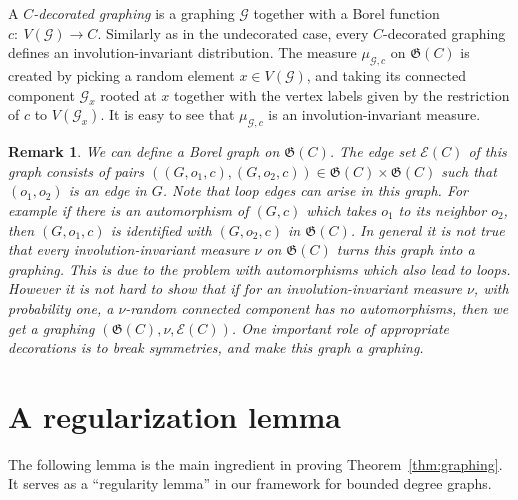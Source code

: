 \documentclass{article}
\newtheorem{remark}[theorem]{Remark}
\def\GG{\mathcal{G}}\def\HH{\mathcal{H}}\def\II{\mathcal{I}}
\def\Gf{\mathfrak{G}}\def\Hf{\mathfrak{H}}\def\If{\mathfrak{I}}
\begin{document}
A \emph{$C$-decorated graphing} is a graphing  $\GG$ together with a
Borel function $c:~V(\GG)\rightarrow C$. Similarly as in the
undecorated case, every $C$-decorated graphing defines an
involution-invariant distribution. The measure $\mu_{\GG,c}$ on
$\Gf(C)$ is created by picking a random element $x\in V(\GG)$, and
taking its connected component $\GG_x$ rooted at $x$ together with
the vertex labels given by the restriction of $c$ to $V(\GG_x)$. It
is easy to see that $\mu_{\GG,c}$ is an involution-invariant measure.


\begin{remark}
\label{rem:UniversalGraphing} We can define a Borel graph on
$\Gf(C)$. The edge set $\mathcal{E}(C)$ of this graph consists of
pairs $((G,o_1,c),(G,o_2,c))\in \Gf(C) \times \Gf(C)$ such that
$(o_1,o_2)$ is an edge in $G$. Note that loop edges can arise in this
graph. For example if there is an automorphism of $(G,c)$ which takes
$o_1$ to its neighbor $o_2$, then $(G,o_1,c)$ is identified with
$(G,o_2,c)$ in $\Gf(C)$. In general it is not true that every
involution-invariant measure $\nu$ on $\Gf(C)$ turns this graph into
a graphing. This is due to the problem with automorphisms which also
lead to loops. However it is not hard to show that if for an
involution-invariant measure $\nu$, with probability one, a
$\nu$-random connected component has no automorphisms, then we get a
graphing $(\Gf(C),\nu,\mathcal{E}(C))$. One important role of
appropriate decorations is to break symmetries, and make this graph a
graphing.
\end{remark}

\section{A regularization lemma}

The following lemma is the main ingredient in proving
Theorem~\ref{thm:graphing}. It serves as a ``regularity lemma'' in
our framework for bounded degree graphs.
\end{document}
